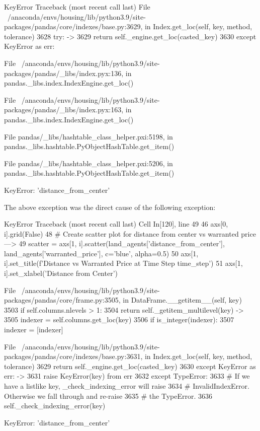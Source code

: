 KeyError                                  Traceback (most recent call last)
File ~/anaconda/envs/housing/lib/python3.9/site-packages/pandas/core/indexes/base.py:3629, in Index.get_loc(self, key, method, tolerance)
   3628 try:
-> 3629     return self._engine.get_loc(casted_key)
   3630 except KeyError as err:

File ~/anaconda/envs/housing/lib/python3.9/site-packages/pandas/_libs/index.pyx:136, in pandas._libs.index.IndexEngine.get_loc()

File ~/anaconda/envs/housing/lib/python3.9/site-packages/pandas/_libs/index.pyx:163, in pandas._libs.index.IndexEngine.get_loc()

File pandas/_libs/hashtable_class_helper.pxi:5198, in pandas._libs.hashtable.PyObjectHashTable.get_item()

File pandas/_libs/hashtable_class_helper.pxi:5206, in pandas._libs.hashtable.PyObjectHashTable.get_item()

KeyError: 'distance_from_center'

The above exception was the direct cause of the following exception:

KeyError                                  Traceback (most recent call last)
Cell In[120], line 49
     46 axs[0, i].grid(False)
     48 # Create scatter plot for distance from center vs warranted price
---> 49 scatter = axs[1, i].scatter(land_agents['distance_from_center'], land_agents['warranted_price'], c='blue', alpha=0.5)
     50 axs[1, i].set_title(f'Distance vs Warranted Price at Time Step {time_step}')
     51 axs[1, i].set_xlabel('Distance from Center')

File ~/anaconda/envs/housing/lib/python3.9/site-packages/pandas/core/frame.py:3505, in DataFrame.__getitem__(self, key)
   3503 if self.columns.nlevels > 1:
   3504     return self._getitem_multilevel(key)
-> 3505 indexer = self.columns.get_loc(key)
   3506 if is_integer(indexer):
   3507     indexer = [indexer]

File ~/anaconda/envs/housing/lib/python3.9/site-packages/pandas/core/indexes/base.py:3631, in Index.get_loc(self, key, method, tolerance)
   3629     return self._engine.get_loc(casted_key)
   3630 except KeyError as err:
-> 3631     raise KeyError(key) from err
   3632 except TypeError:
   3633     # If we have a listlike key, _check_indexing_error will raise
   3634     #  InvalidIndexError. Otherwise we fall through and re-raise
   3635     #  the TypeError.
   3636     self._check_indexing_error(key)

KeyError: 'distance_from_center'
